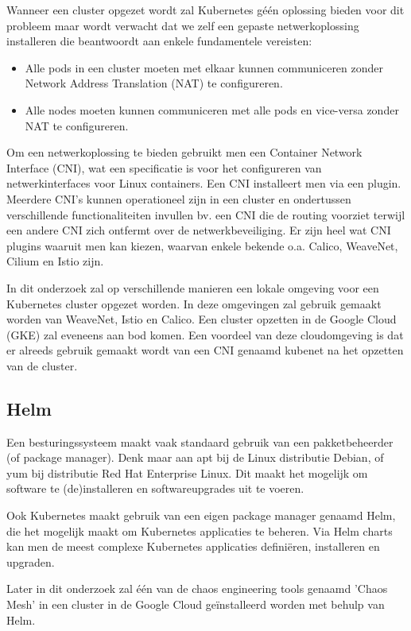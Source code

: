 Wanneer een cluster opgezet wordt zal Kubernetes géén oplossing bieden voor dit probleem maar wordt verwacht dat we zelf een gepaste netwerkoplossing installeren die beantwoordt aan enkele fundamentele vereisten: 
\begin{itemize}
    \item Alle pods in een cluster moeten met elkaar kunnen communiceren zonder Network Address Translation (NAT) te configureren.
    \item Alle nodes moeten kunnen communiceren met alle pods en vice-versa zonder NAT te configureren.
\end{itemize} 

Om een netwerkoplossing te bieden gebruikt men een Container Network Interface (CNI), wat een specificatie is voor het configureren van netwerkinterfaces voor Linux containers. Een CNI installeert men via een plugin. Meerdere CNI's kunnen operationeel zijn in een cluster en ondertussen verschillende functionaliteiten invullen bv. een CNI die de routing voorziet terwijl een andere CNI zich ontfermt over de netwerkbeveiliging. Er zijn heel wat CNI plugins waaruit men kan kiezen, waarvan enkele bekende o.a. Calico, WeaveNet, Cilium en Istio zijn. \autocite{Power2019}

In dit onderzoek zal op verschillende manieren een lokale omgeving voor een Kubernetes cluster opgezet worden. In deze omgevingen zal gebruik gemaakt worden van WeaveNet, Istio en Calico. Een cluster opzetten in de Google Cloud (GKE) zal eveneens aan bod komen. Een voordeel van deze cloudomgeving is dat er alreeds gebruik gemaakt wordt van een CNI genaamd kubenet na het opzetten van de cluster.    
 
\subsection{Helm}

Een besturingssysteem maakt vaak standaard gebruik van een pakketbeheerder (of package manager). Denk maar aan apt bij de Linux distributie Debian, of yum bij distributie Red Hat Enterprise Linux. Dit maakt het mogelijk om software te (de)installeren en softwareupgrades uit te voeren.

Ook Kubernetes maakt gebruik van een eigen package manager genaamd Helm, die het mogelijk maakt om Kubernetes applicaties te beheren. Via Helm charts kan men de meest complexe Kubernetes applicaties definiëren, installeren en upgraden.

Later in dit onderzoek zal één van de chaos engineering tools genaamd 'Chaos Mesh' in een cluster in de Google Cloud geïnstalleerd worden met behulp van Helm.  

